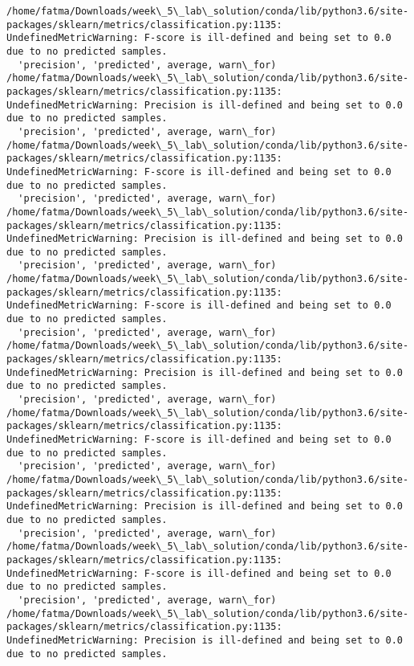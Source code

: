 \documentclass[11pt]{article}
\begin{document}
    \begin{Verbatim}[commandchars=\\\{\}]
/home/fatma/Downloads/week\_5\_lab\_solution/conda/lib/python3.6/site-packages/sklearn/metrics/classification.py:1135: UndefinedMetricWarning: F-score is ill-defined and being set to 0.0 due to no predicted samples.
  'precision', 'predicted', average, warn\_for)
/home/fatma/Downloads/week\_5\_lab\_solution/conda/lib/python3.6/site-packages/sklearn/metrics/classification.py:1135: UndefinedMetricWarning: Precision is ill-defined and being set to 0.0 due to no predicted samples.
  'precision', 'predicted', average, warn\_for)
/home/fatma/Downloads/week\_5\_lab\_solution/conda/lib/python3.6/site-packages/sklearn/metrics/classification.py:1135: UndefinedMetricWarning: F-score is ill-defined and being set to 0.0 due to no predicted samples.
  'precision', 'predicted', average, warn\_for)
/home/fatma/Downloads/week\_5\_lab\_solution/conda/lib/python3.6/site-packages/sklearn/metrics/classification.py:1135: UndefinedMetricWarning: Precision is ill-defined and being set to 0.0 due to no predicted samples.
  'precision', 'predicted', average, warn\_for)
/home/fatma/Downloads/week\_5\_lab\_solution/conda/lib/python3.6/site-packages/sklearn/metrics/classification.py:1135: UndefinedMetricWarning: F-score is ill-defined and being set to 0.0 due to no predicted samples.
  'precision', 'predicted', average, warn\_for)
/home/fatma/Downloads/week\_5\_lab\_solution/conda/lib/python3.6/site-packages/sklearn/metrics/classification.py:1135: UndefinedMetricWarning: Precision is ill-defined and being set to 0.0 due to no predicted samples.
  'precision', 'predicted', average, warn\_for)
/home/fatma/Downloads/week\_5\_lab\_solution/conda/lib/python3.6/site-packages/sklearn/metrics/classification.py:1135: UndefinedMetricWarning: F-score is ill-defined and being set to 0.0 due to no predicted samples.
  'precision', 'predicted', average, warn\_for)
/home/fatma/Downloads/week\_5\_lab\_solution/conda/lib/python3.6/site-packages/sklearn/metrics/classification.py:1135: UndefinedMetricWarning: Precision is ill-defined and being set to 0.0 due to no predicted samples.
  'precision', 'predicted', average, warn\_for)
/home/fatma/Downloads/week\_5\_lab\_solution/conda/lib/python3.6/site-packages/sklearn/metrics/classification.py:1135: UndefinedMetricWarning: F-score is ill-defined and being set to 0.0 due to no predicted samples.
  'precision', 'predicted', average, warn\_for)
/home/fatma/Downloads/week\_5\_lab\_solution/conda/lib/python3.6/site-packages/sklearn/metrics/classification.py:1135: UndefinedMetricWarning: Precision is ill-defined and being set to 0.0 due to no predicted samples.

\end{Verbatim}
\end{document}
